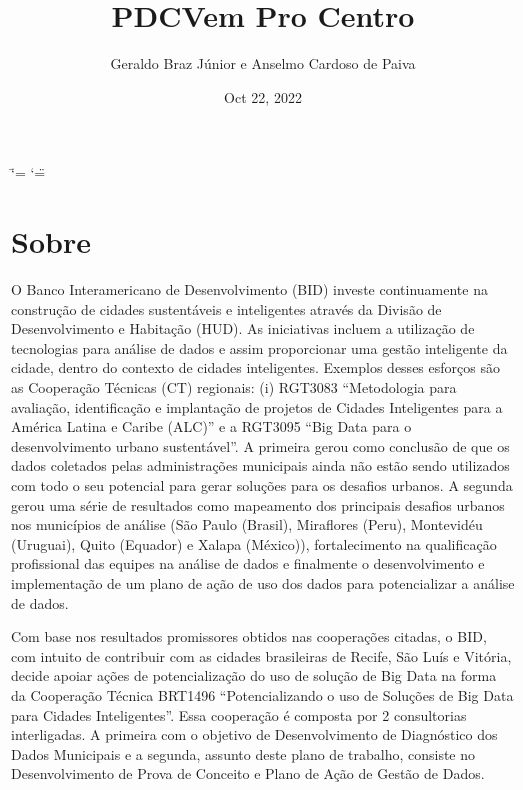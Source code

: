 \documentclass[letterpaper,10pt,brazil]{sphinxmanual}
\title{PDC\sphinxhyphen{}Vem Pro Centro}
\date{Oct 22, 2022}
\author{Geraldo Braz Júnior e Anselmo Cardoso de Paiva}
\begin{document}
\ifdefined\shorthandoff
  \ifnum\catcode`\=\string=\active\shorthandoff{=}\fi
  \ifnum\catcode`\"=\active{}\fi
\fi

\pagestyle{empty}
\sphinxmaketitle
\pagestyle{plain}
\sphinxtableofcontents
\pagestyle{normal}
\label{\detokenize{index::doc}}


\sphinxstepscope


\chapter{Sobre}
\label{\detokenize{sobre:sobre}}\label{\detokenize{sobre::doc}}
\sphinxAtStartPar
O Banco Interamericano de Desenvolvimento (BID) investe continuamente na construção de cidades sustentáveis e inteligentes através da Divisão de Desenvolvimento e Habitação (HUD). As iniciativas incluem a utilização de tecnologias para análise de dados e assim proporcionar uma gestão inteligente da cidade, dentro do contexto de cidades inteligentes. Exemplos desses esforços são as Cooperação Técnicas (CT) regionais: (i) RG\sphinxhyphen{}T3083 “Metodologia para avaliação, identificação e implantação de projetos de Cidades Inteligentes para a América Latina e Caribe (ALC)” e a RG\sphinxhyphen{}T3095 “Big Data para o desenvolvimento urbano sustentável”. A primeira gerou como conclusão de que os dados coletados pelas administrações municipais ainda não estão sendo utilizados com todo o seu potencial para gerar soluções para os desafios urbanos. A segunda gerou uma série de resultados como mapeamento dos principais desafios urbanos nos municípios de análise (São Paulo (Brasil), Miraflores (Peru), Montevidéu (Uruguai), Quito (Equador) e Xalapa (México)), fortalecimento na qualificação profissional das equipes na análise de dados e finalmente o desenvolvimento e implementação de um plano de ação de uso dos dados para potencializar a análise de dados.

\sphinxAtStartPar
Com base nos resultados promissores obtidos nas cooperações citadas, o BID, com intuito de contribuir com as cidades brasileiras de Recife, São Luís e Vitória, decide apoiar ações de potencialização do uso de solução de Big Data na forma da Cooperação Técnica BR\sphinxhyphen{}T1496 “Potencializando o uso de Soluções de Big Data para Cidades Inteligentes”. Essa cooperação é composta por 2 consultorias interligadas. A primeira com o objetivo de Desenvolvimento de Diagnóstico dos Dados Municipais e a segunda, assunto deste plano de trabalho, consiste no Desenvolvimento de Prova de Conceito e Plano de Ação de Gestão de Dados.
\end{document}
